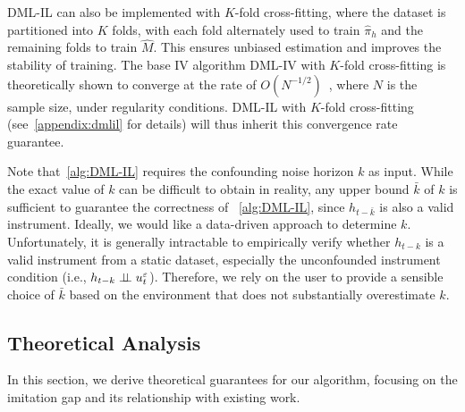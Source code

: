DML-IL can also be implemented with $K$-fold cross-fitting, where the dataset is partitioned into $K$ folds, with each fold alternately used to train $\hat{\pi}_h$ and the remaining folds to train $\hat{M}$. This ensures unbiased estimation and improves the stability of training. The base IV algorithm DML-IV with $K$-fold cross-fitting is theoretically shown to converge at the rate of $O(N^{-1/2})$~\citep{Shao2024}, where $N$ is the sample size, under regularity conditions. DML-IL with $K$-fold cross-fitting (see~\cref{appendix:dmlil} for details) will thus inherit this convergence rate guarantee. 

Note that~\cref{alg:DML-IL} requires the confounding noise horizon $k$ as input. While the exact value of $k$ can be difficult to obtain in reality, any upper bound $\bar{k}$ of $k$ is sufficient to guarantee the correctness of ~\cref{alg:DML-IL}, since $h_{t-\bar{k}}$ is also a valid instrument. Ideally, we would like a data-driven approach to determine $k$. Unfortunately, it is generally intractable to empirically verify whether $h_{t-k}$ is a valid instrument from a static dataset, especially the unconfounded instrument condition (i.e., $h_{t-k}\perp \!\!\! \perp u^\varepsilon_t$). Therefore, we rely on the user to provide a sensible choice of $\bar{k}$ based on the environment that does not substantially overestimate $k$.


\subsection{Theoretical Analysis}\label{sec:theory}





In this section, we derive theoretical guarantees for our algorithm, focusing on the imitation gap and its relationship with existing work.


